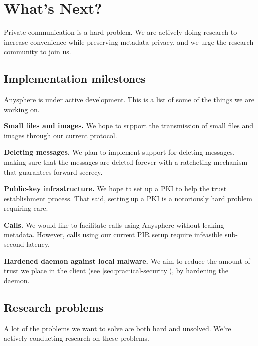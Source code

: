 \section{What's Next?}
\label{sec:future}

Private communication is a hard problem. We are actively doing research to increase convenience while preserving metadata privacy, and we urge the research community to join us.



\subsection{Implementation milestones}
Anysphere is under active development. This is a list of some of the things we are working on.

\textbf{Small files and images.} We hope to support the transmission of small files and images through our current protocol.

\textbf{Deleting messages.} We plan to implement support for deleting messages, making sure that the messages are deleted forever with a ratcheting mechanism that guarantees forward secrecy.

\textbf{Public-key infrastructure.} We hope to set up a PKI to help the trust establishment process. That said, setting up a PKI is a notoriously hard problem requiring care.

\textbf{Calls.} We would like to facilitate calls using Anysphere without leaking metadata. However, calls using our current PIR setup require infeasible sub-second latency.

\textbf{Hardened daemon against local malware.} We aim to reduce the amount of trust we place in the client (see \cref{sec:practical-security}), by hardening the daemon.

\subsection{Research problems} 
A lot of the problems we want to solve are both hard and unsolved. We're actively conducting research on these problems.

